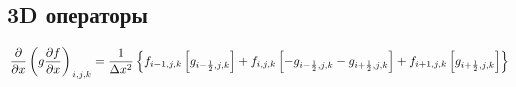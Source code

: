 \subsection*{3D операторы}

\begin{equation*}
    \left.
        \frac
            {\partial}
            {\partial x}
        \left(
            g
            \frac
                {\partial f}
                {\partial x}
        \right)
    \right._{i, j, k}
    =
    \frac
        {1}
        {\Delta x^2}
    \left\{
        f_{i - 1, j, k}
        \left[
              g_{i - \frac{1}{2}, j, k}
        \right]
        +
        f_{i, j, k}
        \left[
            - g_{i - \frac{1}{2}, j, k}
            - g_{i + \frac{1}{2}, j, k}
        \right]
        +
        f_{i + 1, j, k}
        \left[
              g_{i + \frac{1}{2}, j, k}
        \right]
    \right\}
\end{equation*}

